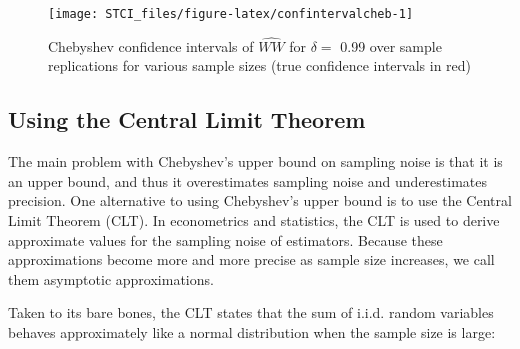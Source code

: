 \documentclass[]{book}
\newenvironment{Shaded}{\begin{snugshade}}{\end{snugshade}}
\newcommand{\DataTypeTok}[1]{\textcolor[rgb]{0.13,0.29,0.53}{#1}}
\newcommand{\DecValTok}[1]{\textcolor[rgb]{0.00,0.00,0.81}{#1}}
\newcommand{\KeywordTok}[1]{\textcolor[rgb]{0.13,0.29,0.53}{\textbf{#1}}}
\newcommand{\NormalTok}[1]{#1}
\newcommand{\OperatorTok}[1]{\textcolor[rgb]{0.81,0.36,0.00}{\textbf{#1}}}
\newcommand{\StringTok}[1]{\textcolor[rgb]{0.31,0.60,0.02}{#1}}
\theoremstyle{definition}
\theoremstyle{definition}
\theoremstyle{definition}
\theoremstyle{remark}
\begin{document}
\begin{Shaded}
\end{Shaded}

\begin{figure}[htbp]

{\centering \texttt{[image: STCI\_files/figure-latex/confintervalcheb-1]} 

}

\caption{Chebyshev confidence intervals of $\hat{WW}$ for $\delta=$ 0.99 over sample replications for various sample sizes (true confidence intervals in red)}\label{fig:confintervalcheb}
\end{figure}

\hypertarget{sec:CLT}{%
\subsection{Using the Central Limit Theorem}\label{sec:CLT}}

The main problem with Chebyshev's upper bound on sampling noise is that it is an upper bound, and thus it overestimates sampling noise and underestimates precision.
One alternative to using Chebyshev's upper bound is to use the Central Limit Theorem (CLT).
In econometrics and statistics, the CLT is used to derive approximate values for the sampling noise of estimators.
Because these approximations become more and more precise as sample size increases, we call them asymptotic approximations.

Taken to its bare bones, the CLT states that the sum of i.i.d. random variables behaves approximately like a normal distribution when the sample size is large:
\end{document}
